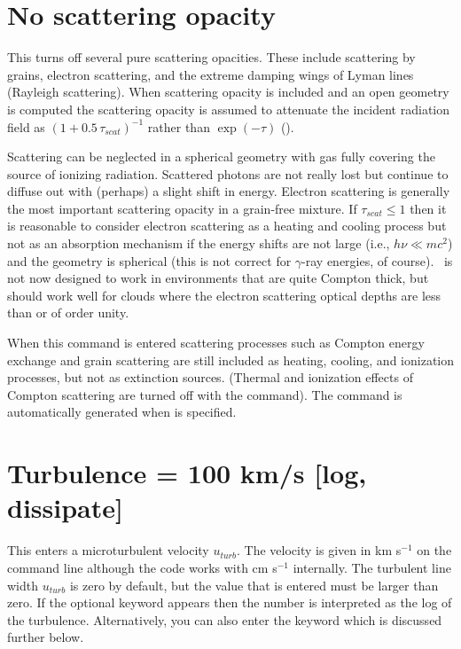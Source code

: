 \section{No scattering opacity}
\label{sec:CommandNoScatteringOpacity}

This turns off several pure scattering opacities.  These include
scattering by grains, electron scattering, and the extreme damping wings
of Lyman lines (Rayleigh scattering).
When scattering opacity is included
and an open geometry is computed the scattering opacity is assumed to
attenuate the incident radiation field as
$\left( {1 + 0.5\,\tau _{scat} } \right)^{ - 1} $
rather than $\exp \left( { - \tau } \right)$ (\citealp{Schuster1905}).

Scattering can be neglected in a spherical geometry with gas fully
covering the source of ionizing radiation.
Scattered photons are not really
lost but continue to diffuse out with (perhaps) a slight shift in energy.
Electron scattering is generally the most important scattering opacity in
a grain-free mixture.
If $ \tau _{scat}  \le 1$
then it is reasonable to consider electron scattering as a heating and
cooling process but not as an absorption mechanism if the energy shifts
are not large (i.e., $ h\nu \ll mc^2$) and the geometry is spherical
(this is not correct for $\gamma$-ray energies,
of course).
\Cloudy\ is not now designed to work in environments that are
quite Compton thick, but should work well for clouds where the electron
scattering optical depths are less than or of order unity.

When this command
is entered scattering processes such as Compton energy exchange 
and grain scattering are still included
as heating, cooling, and ionization processes, but not as extinction sources.
(Thermal and ionization effects of Compton scattering are turned off with
the  command).
The  command is automatically
generated when  is specified.

\section{Turbulence = 100 km/s [log, dissipate]}

This enters a microturbulent velocity $u_{turb}$.
The velocity is given in
km s$^{-1}$ on the command line although the code works with
cm s$^{-1}$ internally. The turbulent line width $u_{turb}$ is zero by default,
but the value that is entered must be larger than zero.
If the optional keyword  appears then the number
is interpreted as the log of the turbulence. Alternatively, you can
also enter the keyword  which is discussed
further below.

